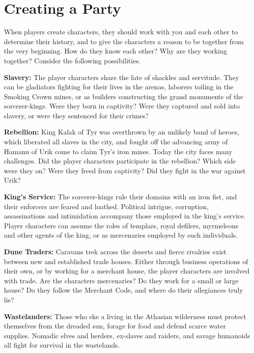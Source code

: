 \section{Creating a Party}
When players create characters, they should work with you and each other to determine their history, and to give the characters a reason to be together from the very beginning. How do they know each other? Why are they working together? Consider the following possibilities.

\textbf{Slavery:} The player characters share the fate of shackles and servitude. They can be gladiators fighting for their lives in the arenas, laborers toiling in the Smoking Crown mines, or as builders constructing the grand monuments of the sorcerer-kings. Were they born in captivity? Were they captured and sold into slavery, or were they sentenced for their crimes?

\textbf{Rebellion:} King Kalak of Tyr was overthrown by an unlikely band of heroes, which liberated all slaves in the city, and fought off the advancing army of Hamanu of Urik come to claim Tyr's iron mines. Today the city faces many challenges. Did the player characters participate in the rebellion? Which side were they on? Were they freed from captivity? Did they fight in the war against Urik?

\textbf{King's Service:} The sorcerer-kings rule their domains with an iron fist, and their enforcers are feared and loathed. Political intrigue, corruption, assassinations and intimidation accompany those employed in the king's service. Player characters can assume the roles of templars, royal defilers, myrmeleons and other agents of the king, or as mercenaries employed by such individuals.

\textbf{Dune Traders:} Caravans trek across the deserts and fierce rivalries exist between new and established trade houses. Either through business operations of their own, or by working for a merchant house, the player characters are involved with trade. Are the characters mercenaries? Do they work for a small or large house? Do they follow the Merchant Code, and where do their allegiances truly lie?

\textbf{Wastelanders:} Those who eke a living in the Athasian wilderness must protect themselves from the dreaded sun, forage for food and defend scarce water supplies. Nomadic elves and herders, ex-slaves and raiders, and savage humanoids all fight for survival in the wastelands.